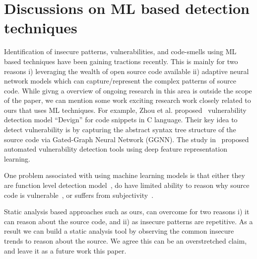 
\section{Discussions on ML based detection techniques}
\label{sec:discussion}
Identification of insecure patterns, vulnerabilities, and code-smells using ML based 
techniques have been gaining tractions recently. This is mainly for two reasons 
i) leveraging the wealth of open source code available ii) adaptive neural network models 
which can capture/represent the complex patterns of source code. While givng a overview of ongoing  research in this area is outside
the scope of the paper, we can mention some work exciting research work closely related to ours that uses ML techniques. 
For example, Zhou et al. proposed~\cite{devign_neurips19} vulnerability detection model ``Devign'' for code snippets in C language. 
Their key idea to detect vulnerability is by capturing the abstract syntax tree structure of the source code via Gated-Graph Neural Network (GGNN).
The study in~\cite{Automated-Vulnerability-Detection-in-Source-Code-Using-Deep-Representation-Learning} proposed automated vulnerability detection 
tools using deep feature representation learning. 

One problem associated with using machine learning models is that either they are function level detection 
model~\cite{Automated-Vulnerability-Detection-in-Source-Code-Using-Deep-Representation-Learning}, 
do have limited ability 
to reason why source code is vulnerable~\cite{devign_neurips19}, or suffers from subjectivity~\cite{are-we-there-yet}.


Static analysis based approaches such as ours, can overcome for two reasons i) it can reason about the source code, and ii) as insecure patterns are repetitive. As a result we can build a static analysis tool by observing 
the common insecure trends to reason about the  source. 
We agree this can be an overstretched claim, and leave it as a future work this paper.  



